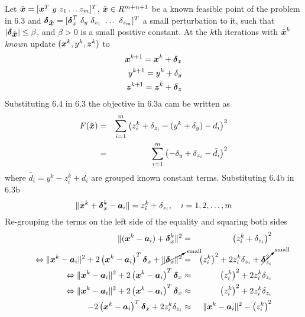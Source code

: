 Let $\tilde{\mbox{\boldmath$x$}} = [\mbox{\boldmath$x$}^T \ y \ z_1 \ldots z_m]^T$, $\tilde{\mbox{\boldmath$x$}} \in R^{m+n+1}$ be a known feasible point of the problem in 6.3 and $\mbox{\boldmath${\delta}$}_{\tilde{\mbox{\boldmath$x$}}} = [\mbox{\boldmath${\delta}$}_x^T \  \delta_y \ \delta_{z_1} \ \ldots \  \delta_{z_m}]^T$ a small perturbation to it, such that $|\mbox{\boldmath${\delta}$}_{\tilde{\mbox{\boldmath$x$}}}| \leq \beta$, and $\beta > 0$ is a small positive constant. At the $k$th iterations with $\tilde{\mbox{\boldmath$x$}}^k$ \textit{known} update $(\mbox{\boldmath$x$}^k, y^k, \mbox{\boldmath$z$}^k)$ to 
\begin{eqnarray} \label{eq:6.4}
\mbox{\boldmath$x$}^{k+1} = \mbox{\boldmath$x$}^k + \mbox{\boldmath${\delta}$}_x \\
\nonumber
y^{k+1} = y^k + \delta_y \\
\nonumber
\mbox{\boldmath$z$}^{k+1} = \mbox{\boldmath$z$}^k + \mbox{\boldmath${\delta}$}_z
\end{eqnarray}
Substituting 6.4 in 6.3 the objective in 6.3a cam be written as
\begin{eqnarray} \label{eq:6.5}
F(\hat{\mbox{\boldmath$x$}}) & =  & \sum^m_{i = 1} \left(z^k_i + \delta_{z_i} - (y^k + \delta_y) - d_i \right)^2 \\
\nonumber
& = & \sum^m_{i = 1} \left(- \delta_y + \delta_{z_i}  - \tilde{d_i} \right)^2
\end{eqnarray}
where $\tilde{d_i} = y^k - z_i^k + d_i$ are grouped known constant terms.
Substituting 6.4b in 6.3b
\begin{equation}
\nonumber
\|\mbox{\boldmath$x$}^k + \mbox{\boldmath${\delta}$}^k_x - \mbox{\boldmath$a$}_i\| = z^k_i +\delta_{z_i}, \quad i = 1, 2, \ldots, m
\end{equation}
Re-grouping the terms on the left side of the equality and squaring both sides 
\begin{eqnarray}
\nonumber
\|(\mbox{\boldmath$x$}^k  - \mbox{\boldmath$a$}_i) + \mbox{\boldmath${\delta}$}^k_x\|^2 & = & \left(z^k_i +\delta_{z_i}\right)^2 \\
\nonumber
\Leftrightarrow 
\|\mbox{\boldmath$x$}^k  - \mbox{\boldmath$a$}_i\|^2 + 2\left( \mbox{\boldmath$x$}^k  - \mbox{\boldmath$a$}_i \right)^T\mbox{\boldmath${\delta}$}_x + \cancelto{\mbox{\scriptsize{small}}}{\|\mbox{\boldmath${\delta}$}_x\|^2}  & = & \left(z_i^k\right)^2 + 2z_i^k\delta_{z_i} + \cancelto{\mbox{\scriptsize{small}}}{\mbox{\boldmath${\delta}$}^2_{z_i}} \\
\nonumber
\Leftrightarrow \|\mbox{\boldmath$x$}^k  - \mbox{\boldmath$a$}_i\|^2 + 2\left( \mbox{\boldmath$x$}^k  - \mbox{\boldmath$a$}_i \right)^T\mbox{\boldmath${\delta}$}_x   & \approx & \left(z_i^k\right)^2 + 2z_i^k\delta_{z_i} \\
\nonumber
\Leftrightarrow \|\mbox{\boldmath$x$}^k  - \mbox{\boldmath$a$}_i\|^2 + 2\left( \mbox{\boldmath$x$}^k  - \mbox{\boldmath$a$}_i \right)^T\mbox{\boldmath${\delta}$}_x   & \approx & \left(z_i^k\right)^2 + 2z_i^k\delta_{z_i} \\
\nonumber
- 2\left( \mbox{\boldmath$x$}^k  - \mbox{\boldmath$a$}_i \right)^T\mbox{\boldmath${\delta}$}_x + 2z_i^k\delta_{z_i}  & \approx & \|\mbox{\boldmath$x$}^k  - \mbox{\boldmath$a$}_i\|^2 - \left(z_i^k\right)^2
\end{eqnarray}
